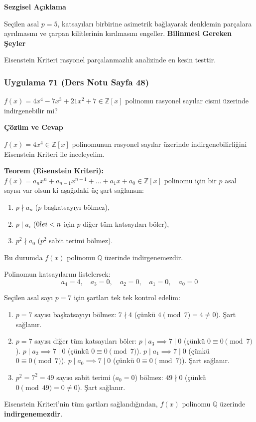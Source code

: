 \documentclass[11pt, a4paper]{article}
\newenvironment{cozum}{
    \vspace{0.5cm}
    \noindent\textcolor{green!60!black}{\faCheckCircle\enspace \textbf{\Large Çözüm ve Cevap}}\par\vspace{0.2cm}
}{}
\newenvironment{sezgisel}{
    \vspace{0.5cm}
    \noindent\textcolor{orange!80!black}{\faLightbulb\enspace \textbf{\Large Sezgisel Açıklama}}\par\vspace{0.2cm}
    \itshape
}{}
\newenvironment{bilgi}{
    \vspace{0.5cm}
    \noindent\textcolor{red!70!black}{\faExclamationTriangle\enspace \textbf{\Large Bilinmesi Gereken Şeyler}}\par\vspace{0.2cm}
}{}
\begin{document}
\begin{sezgisel}
Seçilen asal $p=5$, katsayıları birbirine asimetrik bağlayarak denklemin parçalara ayrılmasını ve çarpan kilitlerinin kırılmasını engeller.
\end{sezgisel}
\begin{bilgi}
Eisenstein Kriteri rasyonel parçalanmazlık analizinde en kesin testtir.
\end{bilgi}

\newpage
\subsubsection{Uygulama 71 (Ders Notu Sayfa 48)}
\begin{sorubox}
$f(x) = 4x^4 - 7x^3 + 21x^2 + 7 \in \mathbb{Z}[x]$ polinomu rasyonel sayılar cismi üzerinde indirgenebilir mi?
\end{sorubox}
\begin{cozum}
$f(x) = 4x^{4} \in \mathbb{Z}[x]$ polinomunun rasyonel sayılar üzerinde indirgenebilirliğini Eisenstein Kriteri ile inceleyelim.

\textbf{Teorem (Eisenstein Kriteri):} $f(x) = a_n x^n + a_{n-1} x^{n-1} + \dots + a_1 x + a_0 \in \mathbb{Z}[x]$ polinomu için bir $p$ asal sayısı var olsun ki aşağıdaki üç şart sağlansın:
\begin{enumerate}
    \item $p \nmid a_n$ ($p$ başkatsayıyı bölmez),
    \item $p \mid a_i$ ($0 \\le i < n$ için $p$ diğer tüm katsayıları böler),
    \item $p^2 \nmid a_0$ ($p^2$ sabit terimi bölmez).
\end{enumerate}
Bu durumda $f(x)$ polinomu $\mathbb{Q}$ üzerinde indirgenemezdir.

Polinomun katsayılarını listelersek:
\[ a_{4} = 4, \quad a_{3} = 0, \quad a_{2} = 0, \quad a_{1} = 0, \quad a_{0} = 0 \]

Seçilen asal sayı $p = 7$ için şartları tek tek kontrol edelim:
\begin{enumerate}
    \item $p = 7$ sayısı başkatsayıyı bölmez: $7 \nmid 4$ (çünkü $4 \pmod{7} = 4 \neq 0$). Şart sağlanır.
    \item $p = 7$ sayısı diğer tüm katsayıları böler:
    $p \mid a_{3} \implies 7 \mid 0$ (çünkü $0 \equiv 0 \pmod{7}$).
    $p \mid a_{2} \implies 7 \mid 0$ (çünkü $0 \equiv 0 \pmod{7}$).
    $p \mid a_{1} \implies 7 \mid 0$ (çünkü $0 \equiv 0 \pmod{7}$).
    $p \mid a_{0} \implies 7 \mid 0$ (çünkü $0 \equiv 0 \pmod{7}$).
    Şart sağlanır.
    \item $p^2 = 7^2 = 49$ sayısı sabit terimi ($a_0 = 0$) bölmez: $49 \nmid 0$ (çünkü $0 \pmod{49} = 0 \neq 0$). Şart sağlanır.
\end{enumerate}

Eisenstein Kriteri'nin tüm şartları sağlandığından, $f(x)$ polinomu $\mathbb{Q}$ üzerinde \textbf{indirgenemezdir}.
\end{cozum}
\end{document}
